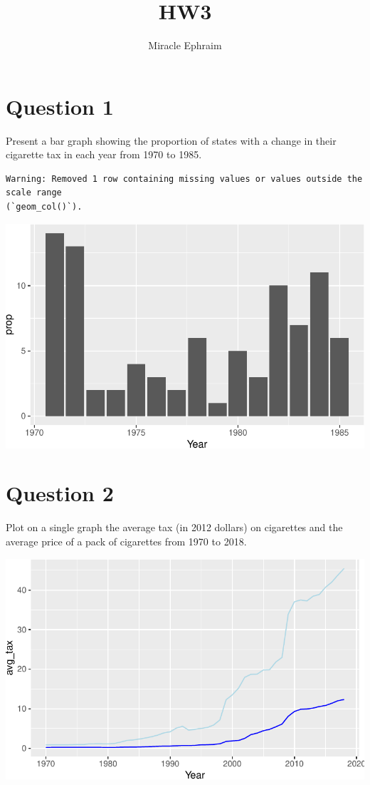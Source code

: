 \documentclass[
]{article}
\title{HW3}
\author{Miracle Ephraim}
\date{}
\begin{document}
\maketitle


\section{Question 1}\label{question-1}

Present a bar graph showing the proportion of states with a change in
their cigarette tax in each year from 1970 to 1985.

\begin{verbatim}
Warning: Removed 1 row containing missing values or values outside the scale range
(`geom_col()`).
\end{verbatim}

\includegraphics{ephraim-m-hwk3-3_files/figure-pdf/unnamed-chunk-1-1.pdf}

\section{Question 2}\label{question-2}

Plot on a single graph the average tax (in 2012 dollars) on cigarettes
and the average price of a pack of cigarettes from 1970 to 2018.

\includegraphics{ephraim-m-hwk3-3_files/figure-pdf/unnamed-chunk-2-1.pdf}
\end{document}
